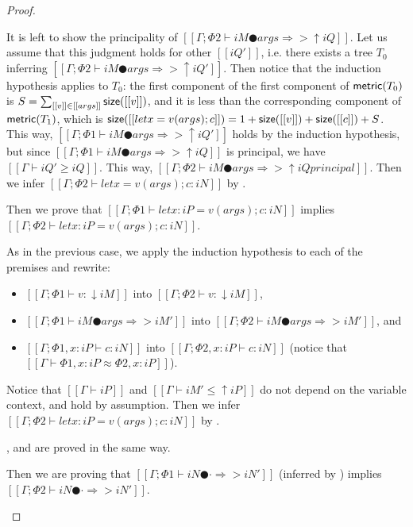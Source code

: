 \begin{proof}
\begin{caseof}
            It is left to show the principality of $[[Γ ; Φ2 ⊢ iM ● args ⇒> ↑iQ]]$.
            Let us assume that this judgment holds for other $[[iQ']]$, 
            i.e.  there exists a tree $T_0$ inferring 
            $[[Γ ; Φ2 ⊢ iM ● args ⇒> ↑iQ']]$.
            Then notice that the induction hypothesis applies to
            $T_0$: the first component of the first component of $\mathsf{metric}(T_0)$
            is $S = \sum_{[[v]] \in [[args]]} \mathsf{size}([[v]])$, and it is less than
            the corresponding component of $\mathsf{metric}(T_1)$, which is
            $\mathsf{size}([[let x = v(args); c]]) = 1 + \mathsf{size}([[v]]) + \mathsf{size}([[c]]) + S$.
            This way, $[[Γ ; Φ1 ⊢ iM ● args ⇒> ↑iQ']]$ holds by the induction hypothesis,
            but since $[[Γ ; Φ1 ⊢ iM ● args ⇒> ↑iQ]]$ is principal, 
            we have $[[Γ ⊢ iQ' ≥ iQ]]$. 
            This way, $[[Γ ; Φ2 ⊢ iM ● args ⇒> ↑iQ principal]]$.
            Then we infer $[[Γ ; Φ2 ⊢ let x = v(args); c : iN]]$ by .

        \item {}
            Then we prove that
            $[[Γ ; Φ1 ⊢ let x:iP = v(args); c : iN]]$ implies
            $[[Γ ; Φ2 ⊢ let x:iP = v(args); c : iN]]$.
        
            As in the previous case, we apply the induction hypothesis to each of the premises
            and rewrite:
            \begin{itemize}
                \item $[[Γ ; Φ1 ⊢ v : ↓iM]]$ into $[[Γ ; Φ2 ⊢ v : ↓iM]]$,
                \item $[[Γ ; Φ1 ⊢ iM ● args ⇒> iM']]$ into $[[Γ ; Φ2 ⊢ iM ● args ⇒> iM']]$, 
                    and
                \item $[[Γ ; Φ1, x:iP ⊢ c : iN]]$ into $[[Γ ; Φ2, x:iP ⊢ c : iN]]$
                (notice that $[[Γ ⊢ Φ1, x:iP ≈ Φ2, x:iP]]$).
            \end{itemize}
            
            Notice that $[[Γ ⊢ iP]]$ and $[[Γ ⊢ iM' ≤ ↑iP]]$ 
            do not depend on the variable context, and hold by assumption.
            Then we infer $[[Γ ; Φ2 ⊢ let x:iP = v(args); c : iN]]$ by .

        \item {}, and 
            are proved in the same way.

        \item {}
            Then we are proving that 
            $[[Γ ; Φ1 ⊢ iN ● · ⇒> iN']]$ (inferred by )
            implies $[[Γ ; Φ2 ⊢ iN ● · ⇒> iN']]$.


\end{caseof}
\end{proof}
